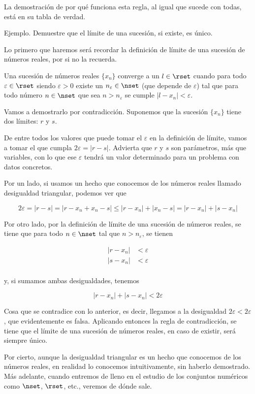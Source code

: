 La demostración de por qué funciona esta regla, al igual que sucede con
todas, está en su tabla de verdad.

Ejemplo. Demuestre que el límite de una sucesión, si existe, es único.

Lo primero que haremos será recordar la definición de límite de una sucesión
de números reales, por si no la recuerda.

Una sucesión de números reales $\{x_n\}$ converge a un $l \in \rset$
cuando para todo $\varepsilon \in \rset$ siendo $\varepsilon > 0$
existe un $n_\varepsilon \in \nset$ (que depende de $\varepsilon$) tal
que para todo número $n \in \nset$ que sea $n > n_\varepsilon$ se
cumple $|l - x_n| < \varepsilon$.

Vamos a demostrarlo por contradicción. Suponemos que la sucesión $\{x_n\}$
tiene dos límites: $r$ y $s$.

De entre todos los valores que puede tomar el $\varepsilon$ en la definición
de límite, vamos a tomar el que cumpla $2 \varepsilon = |r - s|$. Advierta
que $r$ y $s$ son parámetros, más que variables, con lo que ese
$\varepsilon$ tendrá un valor determinado para un problema con datos
concretos.

Por un lado, si usamos un hecho que conocemos de los números reales llamado
desigualdad triangular, podemos ver que

$$ 2 \varepsilon = |r - s| = |r - x_n + x_n - s| \leq |r - x_n| + |x_n - s|
= |r - x_n| + |s - x_n| $$

Por otro lado, por la definición de límite de una sucesión de números
reales, se tiene que para todo $n \in \nset$ tal que $n >
n_\varepsilon$, se tienen

\begin{align*}
  |r - x_n| &< \varepsilon \\
  |s - x_n| &< \varepsilon \\
\end{align*}

\noindent y, si sumamos ambas desigualdades, tenemos

$$ |r - x_n| + |s - x_n| < 2\varepsilon $$

\noindent Cosa que se contradice con lo anterior, es decir, llegamos a la
desigualdad $2\varepsilon < 2\varepsilon$, que evidentemente es falsa.
Aplicando entonces la regla de contradicción, se tiene que el límite de una
sucesión de números reales, en caso de existir, será siempre único.

Por cierto, aunque la desigualdad triangular es un hecho que conocemos de
los números reales, en realidad lo conocemos intuitivamente, sin haberlo
demostrado. Más adelante, cuando entremos de lleno en el estudio de los
conjuntos numéricos como $\nset$, $\rset$, etc., veremos de dónde sale.







